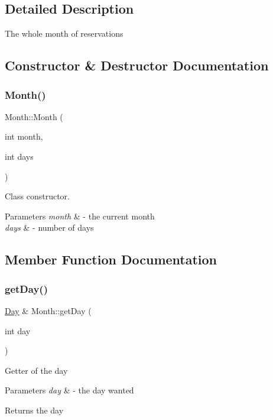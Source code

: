 \subsection{Detailed Description}
The whole month of reservations 

\subsection{Constructor \& Destructor Documentation}
\mbox{\label{class_month_a4abb71ddcd1dfed172a828d8598bbdc7}} 
\subsubsection{\texorpdfstring{Month()}{Month()}}
{\footnotesize\ttfamily Month\+::\+Month (\begin{DoxyParamCaption}\item[{int}]{month,  }\item[{int}]{days }\end{DoxyParamCaption})}



Class constructor. 


\begin{DoxyParams}{Parameters}
{\em month} & -\/ the current month \\
\hline
{\em days} & -\/ number of days \\
\hline
\end{DoxyParams}


\subsection{Member Function Documentation}
\mbox{\label{class_month_aea6a1844798c684548c1de899cf620b2}} 
\subsubsection{\texorpdfstring{get\+Day()}{getDay()}}
{\footnotesize\ttfamily \mbox{\hyperlink{class_day}{Day}} \& Month\+::get\+Day (\begin{DoxyParamCaption}\item[{int}]{day }\end{DoxyParamCaption})}

Getter of the day 
\begin{DoxyParams}{Parameters}
{\em day} & -\/ the day wanted \\
\hline
\end{DoxyParams}
\begin{DoxyReturn}{Returns}
the day 
\end{DoxyReturn}
\mbox{\label{class_month_a5bc7c527734f8bc303fea424cd265357}} 

